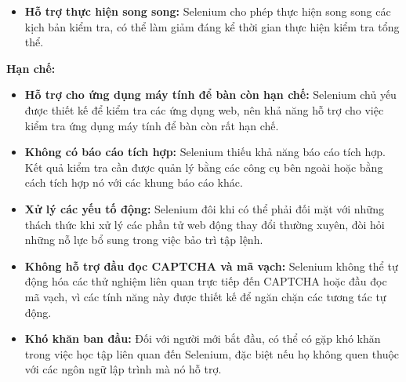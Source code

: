 \begin{enumerate}
\begin{itemize}[left=0.5cm]
        \item[-]\textbf{Hỗ trợ thực hiện song song: } Selenium cho phép thực hiện song song các kịch bản kiểm tra, có thể làm giảm đáng kể thời gian thực hiện kiểm tra tổng thể.
    \end{itemize}
    
\newpage
    \textbf{Hạn chế:}
    \begin{itemize}[left=0.5cm] 
        \item[-] \textbf{Hỗ trợ cho ứng dụng máy tính để bàn còn hạn chế:} Selenium chủ yếu được thiết kế để kiểm tra các ứng dụng web, nên khả năng hỗ trợ cho việc kiểm tra ứng dụng máy tính để bàn còn rất hạn chế.
        
        \item[-] \textbf{Không có báo cáo tích hợp:} Selenium thiếu khả năng báo cáo tích hợp. Kết quả kiểm tra cần được quản lý bằng các công cụ bên ngoài hoặc bằng cách tích hợp nó với các khung báo cáo khác.
        
        \item[-]\textbf{Xử lý các yếu tố động:} Selenium đôi khi có thể phải đối mặt với những thách thức khi xử lý các phần tử web động thay đổi thường xuyên, đòi hỏi những nỗ lực bổ sung trong việc bảo trì tập lệnh.
        
        \item[-] \textbf{Không hỗ trợ đầu đọc CAPTCHA và mã vạch:} Selenium không thể tự động hóa các thử nghiệm liên quan trực tiếp đến CAPTCHA hoặc đầu đọc mã vạch, vì các tính năng này được thiết kế để ngăn chặn các tương tác tự động.
        
        \item[-]\textbf{Khó khăn ban đầu:} Đối với người mới bắt đầu, có thể có gặp khó khăn trong việc học tập liên quan đến Selenium, đặc biệt nếu họ không quen thuộc với các ngôn ngữ lập trình mà nó hỗ trợ.\cite{noauthor_20_nodate_advantages-disadvantages}
    \end{itemize}

\end{enumerate}

